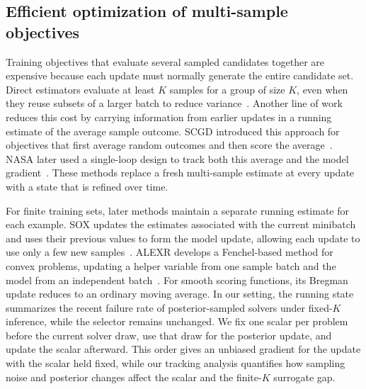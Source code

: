 \subsection{Efficient optimization of multi-sample objectives}
\label{sec:related-efficient-optimization}

Training objectives that evaluate several sampled candidates together are expensive because each update must normally generate the entire candidate set.
Direct estimators evaluate at least $K$ samples for a group of size $K$, even when they reuse subsets of a larger batch to reduce variance~\citep{hoeffding1948class,walder2025pkpo}.
Another line of work reduces this cost by carrying information from earlier updates in a running estimate of the average sample outcome.
SCGD introduced this approach for objectives that first average random outcomes and then score the average~\citep{wang2017scgd}.
NASA later used a single-loop design to track both this average and the model gradient~\citep{ghadimi2020single}.
These methods replace a fresh multi-sample estimate at every update with a state that is refined over time.

For finite training sets, later methods maintain a separate running estimate for each example.
SOX updates the estimates associated with the current minibatch and uses their previous values to form the model update, allowing each update to use only a few new samples~\citep{pmlr-v162-wang22ak}.
ALEXR develops a Fenchel-based method for convex problems, updating a helper variable from one sample batch and the model from an independent batch~\citep{pmlr-v267-wang25dw}.
For smooth scoring functions, its Bregman update reduces to an ordinary moving average.
In our setting, the running state summarizes the recent failure rate of posterior-sampled solvers under fixed-$K$ inference, while the selector remains unchanged.
We fix one scalar per problem before the current solver draw, use that draw for the posterior update, and update the scalar afterward.
This order gives an unbiased gradient for the update with the scalar held fixed, while our tracking analysis quantifies how sampling noise and posterior changes affect the scalar and the finite-$K$ surrogate gap.

